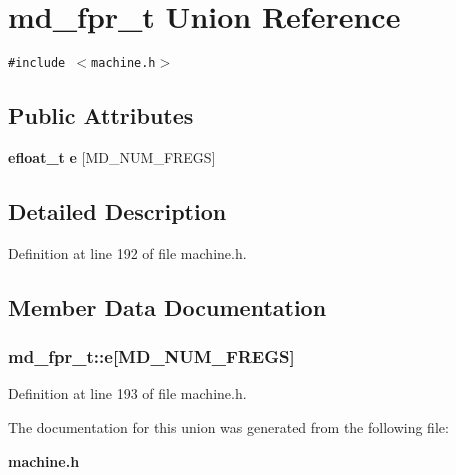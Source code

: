 \section{md\_\-fpr\_\-t Union Reference}
\label{unionmd__fpr__t}
{\tt \#include $<$machine.h$>$}

\subsection*{Public Attributes}
\begin{CompactItemize}
\item 
{\bf efloat\_\-t} {\bf e} [MD\_\-NUM\_\-FREGS]
\end{CompactItemize}


\subsection{Detailed Description}


Definition at line 192 of file machine.h.

\subsection{Member Data Documentation}
\subsubsection[{e}]{ {\bf md\_\-fpr\_\-t::e}[MD\_\-NUM\_\-FREGS]}\label{unionmd__fpr__t_1a58a0ffa7ccd11adf6580ba87165a26}




Definition at line 193 of file machine.h.

The documentation for this union was generated from the following file:\begin{CompactItemize}
\item 
{\bf machine.h}\end{CompactItemize}
